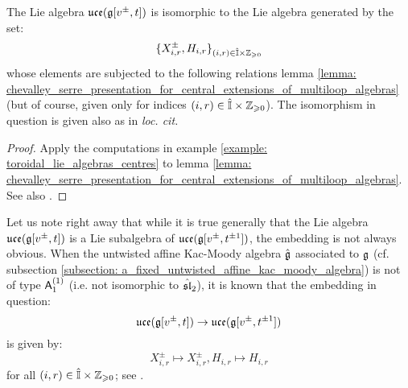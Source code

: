         \begin{corollary}
            The Lie algebra $\uce(\g[v^{\pm}, t])$ is isomorphic to the Lie algebra generated by the set:
                $$\{ X_{i, r}^{\pm}, H_{i, r} \}_{(i, r) \in \hat{\simpleroots} \x \Z_{\geq 0}}$$
            whose elements are subjected to the following relations lemma \ref{lemma: chevalley_serre_presentation_for_central_extensions_of_multiloop_algebras} (but of course, given only for indices $(i, r) \in \hat{\simpleroots} \x \Z_{\geq 0}$). The isomorphism in question is given also as in \textit{loc. cit.}
        \end{corollary}
            \begin{proof}
                Apply the computations in example \ref{example: toroidal_lie_algebras_centres} to lemma \ref{lemma: chevalley_serre_presentation_for_central_extensions_of_multiloop_algebras}. See also \cite[Remark 4.5]{guay_nakajima_wendlandt_affine_yangian_vertex_representations_and_PBW}.
            \end{proof}
        \begin{remark}
            Let us note right away that while it is true generally that the Lie algebra $\uce(\g[v^{\pm}, t])$ is a Lie subalgebra of $\uce(\g[v^{\pm}, t^{\pm 1}])$, the embedding is not always obvious. When the untwisted affine Kac-Moody algebra $\hat{\g}$ associated to $\g$ (cf. subsection \ref{subsection: a_fixed_untwisted_affine_kac_moody_algebra}) is not of type $\sfA_1^{(1)}$ (i.e. not isomorphic to $\hat{\sl}_2$), it is known that the embedding in question:
                $$\uce(\g[v^{\pm}, t]) \to \uce(\g[v^{\pm}, t^{\pm 1}])$$
            is given by:
                $$X_{i, r}^{\pm} \mapsto X_{i, r}^{\pm}, H_{i, r} \mapsto H_{i, r}$$
            for all $(i, r) \in \hat{\simpleroots} \x \Z_{\geq 0}$; see \cite[Corollary 4.6]{guay_nakajima_wendlandt_affine_yangian_vertex_representations_and_PBW}.
        \end{remark}